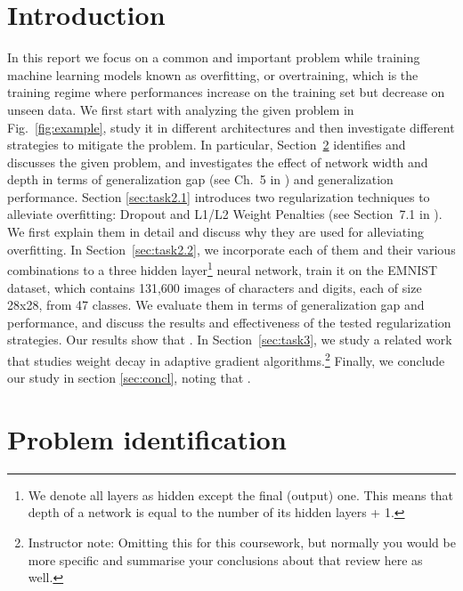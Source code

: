 \documentclass{article}
\begin{document}
\section{Introduction}
\label{sec:intro}
In this report we focus on a common and important problem while training machine learning models known as overfitting, or overtraining, which is the training regime where performances increase on the training set but decrease on unseen data.
We first start with analyzing the given problem in Fig.~\ref{fig:example}, study it in different architectures and then investigate different strategies to mitigate the problem.
In particular, Section~\ref{sec:task1} identifies and discusses the given problem, and investigates the effect of network width and depth in terms of generalization gap (see Ch.~5 in \citealt{Goodfellow-et-al-2016}) and generalization performance.
Section \ref{sec:task2.1} introduces two regularization techniques to alleviate overfitting: Dropout \cite{srivastava2014dropout} and L1/L2 Weight Penalties (see Section~7.1 in \citealt{Goodfellow-et-al-2016}). 
We first explain them in detail and discuss why they are used for alleviating overfitting.
In Section~\ref{sec:task2.2}, we incorporate each of them and their various combinations to a three hidden layer\footnote{We denote all layers as hidden except the final (output) one. This means that depth of a network is equal to the number of its hidden layers + 1.} neural network, train it on the EMNIST dataset, which contains 131,600 images of characters and digits, each of size 28x28, from 47 classes.
We evaluate them in terms of generalization gap and performance, and discuss the results and effectiveness of the tested regularization strategies.
Our results show that \questionThree.
In Section~\ref{sec:task3}, we study a related work that studies weight decay in adaptive gradient algorithms.\footnote{Instructor note: Omitting this for this coursework, but normally you would be more specific and summarise your conclusions about that review here as well.}
Finally, we conclude our study in section \ref{sec:concl}, noting that \questionFour.


\section{Problem identification}
\label{sec:task1}
\end{document}
